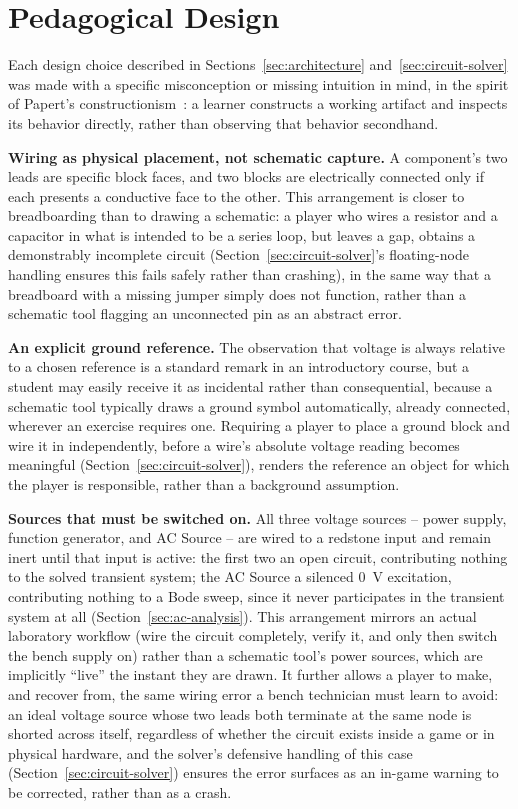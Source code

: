 \section{Pedagogical Design}
\label{sec:pedagogy}

Each design choice described in Sections~\ref{sec:architecture}
and~\ref{sec:circuit-solver} was made with a specific misconception or missing intuition in
mind, in the spirit of Papert's constructionism~\cite{papert1980mindstorms}: a learner
constructs a working artifact and inspects its behavior directly, rather than observing that
behavior secondhand.

\textbf{Wiring as physical placement, not schematic capture.} A component's two leads are
specific block faces, and two blocks are electrically connected only if each presents a
conductive face to the other. This arrangement is closer to breadboarding than to drawing a
schematic: a player who wires a resistor and a capacitor in what is intended to be a series
loop, but leaves a gap, obtains a demonstrably incomplete circuit (Section~\ref{sec:circuit-solver}'s
floating-node handling ensures this fails safely rather than crashing), in the same way that
a breadboard with a missing jumper simply does not function, rather than a schematic tool
flagging an unconnected pin as an abstract error.

\textbf{An explicit ground reference.} The observation that voltage is always relative to a
chosen reference is a standard remark in an introductory course, but a student may easily
receive it as incidental rather than consequential, because a schematic tool typically draws
a ground symbol automatically, already connected, wherever an exercise requires one.
Requiring a player to place a ground block and wire it in independently, before a wire's
absolute voltage reading becomes meaningful (Section~\ref{sec:circuit-solver}), renders the
reference an object for which the player is responsible, rather than a background
assumption.

\textbf{Sources that must be switched on.} All three voltage sources -- power supply,
function generator, and AC Source -- are wired to a redstone input and remain inert until
that input is active: the first two an open circuit, contributing nothing to the solved
transient system; the AC Source a silenced 0~V excitation, contributing nothing to a Bode
sweep, since it never participates in the transient system at all
(Section~\ref{sec:ac-analysis}). This arrangement mirrors an actual laboratory
workflow (wire the circuit completely, verify it, and only then switch the bench supply on)
rather than a schematic tool's power sources, which are implicitly ``live'' the instant they
are drawn. It further allows a player to make, and recover from, the same wiring error a
bench technician must learn to avoid: an ideal voltage source whose two leads both terminate
at the same node is shorted across itself, regardless of whether the circuit exists inside a
game or in physical hardware, and the solver's defensive handling of this case
(Section~\ref{sec:circuit-solver}) ensures the error surfaces as an in-game warning to be
corrected, rather than as a crash.

